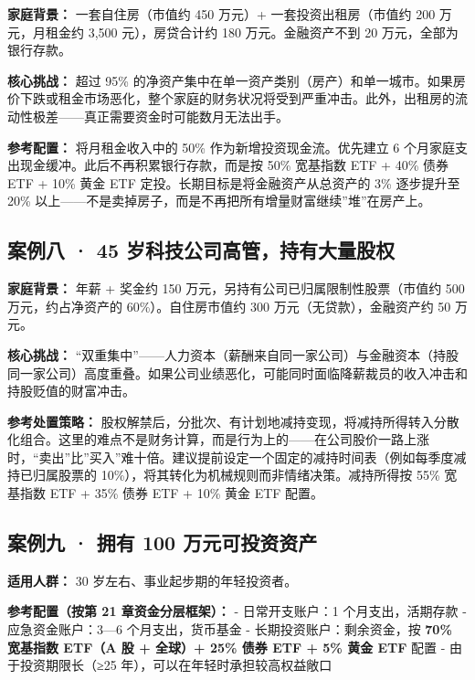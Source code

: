 \documentclass[a4paper,11pt,oneside,fontset=none,UTF8,zihao=-4]{ctexbook}
\begin{document}
\textbf{家庭背景：} 一套自住房（市值约 450 万元）+
一套投资出租房（市值约 200 万元，月租金约 3,500 元），房贷合计约 180
万元。金融资产不到 20 万元，全部为银行存款。

\textbf{核心挑战：} 超过 95\%
的净资产集中在单一资产类别（房产）和单一城市。如果房价下跌或租金市场恶化，整个家庭的财务状况将受到严重冲击。此外，出租房的流动性极差------真正需要资金时可能数月无法出手。

\textbf{参考配置：} 将月租金收入中的 50\% 作为新增投资现金流。优先建立 6
个月家庭支出现金缓冲。此后不再积累银行存款，而是按 50\% 宽基指数 ETF +
40\% 债券 ETF + 10\% 黄金 ETF 定投。长期目标是将金融资产从总资产的 3\%
逐步提升至 20\%
以上------不是卖掉房子，而是不再把所有增量财富继续''堆''在房产上。

\subsection{案例八 · 45
岁科技公司高管，持有大量股权}\label{ux6848ux4f8bux516b-45-ux5c81ux79d1ux6280ux516cux53f8ux9ad8ux7ba1ux6301ux6709ux5927ux91cfux80a1ux6743}

\textbf{家庭背景：} 年薪 + 奖金约 150
万元，另持有公司已归属限制性股票（市值约 500 万元，约占净资产的
60\%）。自住房市值约 300 万元（无贷款），金融资产约 50 万元。

\textbf{核心挑战：}
``双重集中''------人力资本（薪酬来自同一家公司）与金融资本（持股同一家公司）高度重叠。如果公司业绩恶化，可能同时面临降薪裁员的收入冲击和持股贬值的财富冲击。

\textbf{参考处置策略：}
股权解禁后，分批次、有计划地减持变现，将减持所得转入分散化组合。这里的难点不是财务计算，而是行为上的------在公司股价一路上涨时，``卖出''比''买入''难十倍。建议提前设定一个固定的减持时间表（例如每季度减持已归属股票的
10\%），将其转化为机械规则而非情绪决策。减持所得按 55\% 宽基指数 ETF +
35\% 债券 ETF + 10\% 黄金 ETF 配置。

\subsection{案例九 · 拥有 100
万元可投资资产}\label{ux6848ux4f8bux4e5d-ux62e5ux6709-100-ux4e07ux5143ux53efux6295ux8d44ux8d44ux4ea7}

\textbf{适用人群：} 30 岁左右、事业起步期的年轻投资者。

\textbf{参考配置（按第 21 章资金分层框架）：} - 日常开支账户：1
个月支出，活期存款 - 应急资金账户：3---6 个月支出，货币基金 -
长期投资账户：剩余资金，按 \textbf{70\% 宽基指数 ETF（A 股 + 全球）+
25\% 债券 ETF + 5\% 黄金 ETF} 配置 - 由于投资期限长（≥25
年），可以在年轻时承担较高权益敞口
\end{document}

